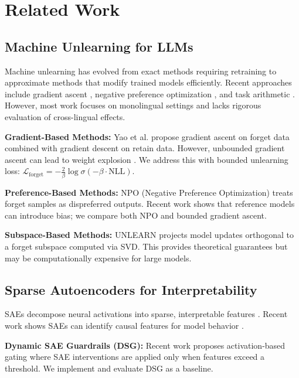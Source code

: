 \documentclass[11pt]{article}
\begin{document}
\section{Related Work}

\subsection{Machine Unlearning for LLMs}

Machine unlearning has evolved from exact methods requiring retraining \cite{cao2015towards,guo2019certified} to approximate methods that modify trained models efficiently. Recent approaches include gradient ascent \cite{yao2024machine}, negative preference optimization \cite{liu2024rethinking}, and task arithmetic \cite{ilharco2023editing}. However, most work focuses on monolingual settings and lacks rigorous evaluation of cross-lingual effects.

\textbf{Gradient-Based Methods:} Yao et al. \cite{yao2024machine} propose gradient ascent on forget data combined with gradient descent on retain data. However, unbounded gradient ascent can lead to weight explosion \cite{liu2024rethinking}. We address this with bounded unlearning loss: $\mathcal{L}_{\text{forget}} = -\frac{2}{\beta} \log \sigma(-\beta \cdot \text{NLL})$.

\textbf{Preference-Based Methods:} NPO (Negative Preference Optimization) \cite{zhang2024negative} treats forget samples as dispreferred outputs. Recent work \cite{simplicity2024} shows that reference models can introduce bias; we compare both NPO and bounded gradient ascent.

\textbf{Subspace-Based Methods:} UNLEARN \cite{pawelczyk2024unlearn} projects model updates orthogonal to a forget subspace computed via SVD. This provides theoretical guarantees but may be computationally expensive for large models.

\subsection{Sparse Autoencoders for Interpretability}

SAEs decompose neural activations into sparse, interpretable features \cite{bricken2023monosemanticity,cunningham2023sparse}. Recent work shows SAEs can identify causal features for model behavior \cite{marks2024sparse,templeton2024scaling}.

\textbf{Dynamic SAE Guardrails (DSG):} Recent work \cite{dsg2025} proposes activation-based gating where SAE interventions are applied only when features exceed a threshold. We implement and evaluate DSG as a baseline.
\end{document}
